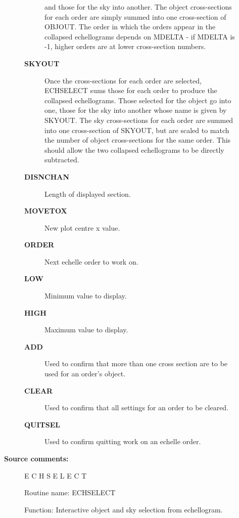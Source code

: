 \begin{description}
\begin{description}
\begin{description}
 and those for the sky into another.  The object cross-sections for
 each order are simply summed into one cross-section of OBJOUT.  The
 order in which the orders appear in the collapsed echellograms
 depends on MDELTA - if MDELTA is -1, higher orders are at lower
 cross-section numbers.
\item [\textbf{SKYOUT}]
 Once the cross-sections for each order are selected, ECHSELECT sums
 those for each order to produce the collapsed echellograms.  Those
 selected for the object go into one, those for the sky into another
 whose name is given by SKYOUT.  The sky cross-sections for each order
 are summed into one cross-section of SKYOUT, but are scaled to match
 the number of object cross-sections for the same order.  This should
 allow the two collapsed echellograms to be directly subtracted.
\item [\textbf{DISNCHAN}]
 Length of displayed section.
\item [\textbf{MOVETOX}]
 New plot centre x value.
\item [\textbf{ORDER}]
 Next echelle order to work on.
\item [\textbf{LOW}]
 Minimum value to display.
\item [\textbf{HIGH}]
 Maximum value to display.
\item [\textbf{ADD}]
 Used to confirm that more than one cross section are to be used for
 an order's object.
\item [\textbf{CLEAR}]
 Used to confirm that all settings for an order to be cleared.
\item [\textbf{QUITSEL}]
 Used to confirm quitting work on an echelle order.
\end{description}

\item [\textbf{Source comments:}]
\begin{terminalv}
 E C H S E L E C T

 Routine name:
    ECHSELECT

 Function:
    Interactive object and sky selection from echellogram.


\end{terminalv}
\end{description}
\end{description}
